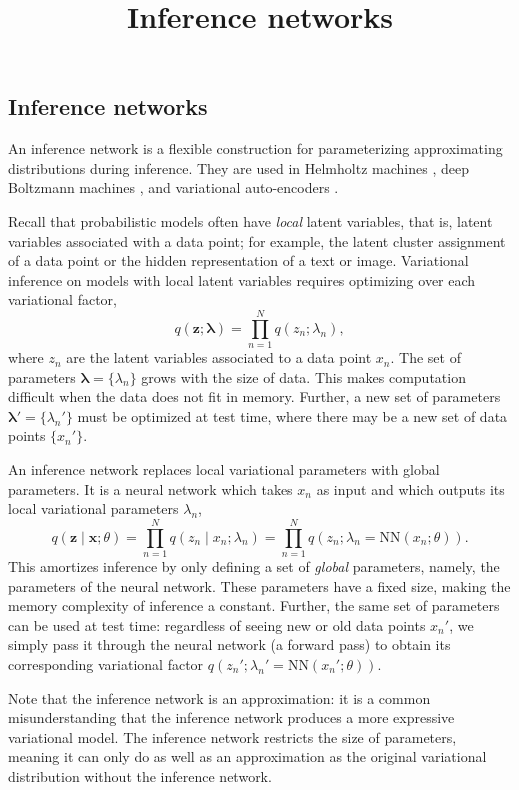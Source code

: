 \title{Inference networks}

\subsection{Inference networks}

An inference network is a flexible construction for parameterizing
approximating distributions during inference.
They are used in Helmholtz machines \citep{dayan1995helmholtz}, deep
Boltzmann machines \citep{salakhutdinov2010efficient}, and
variational auto-encoders \citep{kingma2014auto,rezende2014stochastic}.

Recall that probabilistic models often have \emph{local} latent
variables, that is, latent variables associated with a data point; for
example, the latent cluster assignment of a data point or the hidden
representation of a text or image.
Variational
inference on models with local latent variables
requires optimizing over each variational factor,
\begin{equation*}
q(\mathbf{z}; \mathbf{\lambda}) = \prod_{n=1}^N q(z_n; \lambda_n),
\end{equation*}
where $z_n$ are the latent variables associated to a data point $x_n$.
The set of parameters $\mathbf{\lambda}=\{\lambda_n\}$ grows with the
size of data. This makes computation difficult when the data
does not fit in memory.
Further, a new set of parameters $\mathbf{\lambda}'=\{\lambda_n'\}$
must be optimized at test time, where there may be a new set of data
points $\{x_n'\}$.

An inference network replaces local variational parameters with global
parameters. It is a neural network
which takes $x_n$ as input and which outputs its local variational parameters
$\lambda_n$,
\begin{equation*}
q(\mathbf{z}\mid \mathbf{x}; \theta)
= \prod_{n=1}^N q(z_n \mid x_n; \lambda_n)
= \prod_{n=1}^N q(z_n; \lambda_n = \mathrm{NN}(x_n; \theta)).
\end{equation*}
This amortizes inference by only defining a set of \emph{global} parameters,
namely, the parameters of the neural network. These parameters have a
fixed size, making the memory complexity of inference a constant.
Further, the same set of parameters can be used at test time:
regardless of seeing new or old data points $x_n'$, we simply pass it
through the neural network (a forward pass) to obtain its
corresponding variational factor $q(z_n'; \lambda_n' =
\mathrm{NN}(x_n'; \theta))$.

Note that the inference network is an approximation: it is a common
misunderstanding that the inference network produces a more expressive
variational model. The inference network restricts the size of
parameters, meaning it can only do as well as an approximation as the
original variational distribution without the inference network.


